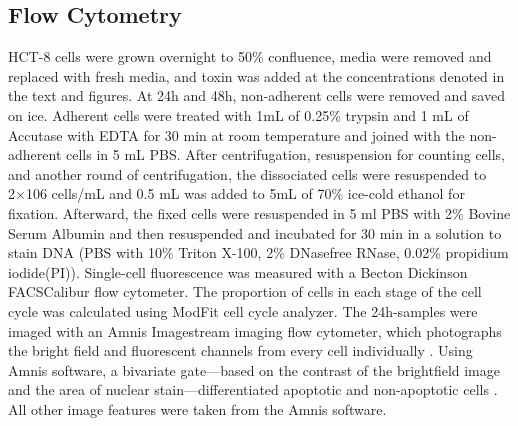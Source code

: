 \subsection{Flow Cytometry}
HCT-8 cells were grown overnight to 50\% confluence, media were removed and replaced with fresh media, and toxin was added at the concentrations denoted in the text and figures. At 24h and 48h, non-adherent cells were removed and saved on ice. Adherent cells were treated with 1mL of 0.25\% trypsin and 1 mL of Accutase with EDTA for 30 min at room temperature and joined with the non-adherent cells in 5 mL PBS. After centrifugation, resuspension for counting cells, and another round of centrifugation, the dissociated cells were resuspended to 2×106 cells/mL and 0.5 mL was added to 5mL of 70\% ice-cold ethanol for fixation. Afterward, the fixed cells were resuspended in 5 ml PBS with 2\% Bovine Serum Albumin and then resuspended and incubated for 30 min in a solution to stain DNA (PBS with 10\% Triton X-100, 2\% DNasefree RNase, 0.02\% propidium iodide(PI)). Single-cell fluorescence was measured with a Becton Dickinson FACSCalibur flow cytometer. The proportion of cells in each stage of the cell cycle was calculated using ModFit cell cycle analyzer. The 24h-samples were imaged with an Amnis Imagestream imaging flow cytometer, which photographs the bright field and fluorescent channels from every cell individually \cite{George:2004jj}. Using Amnis software, a bivariate gate—based on the contrast of the brightfield image and the area of nuclear stain—differentiated apoptotic and non-apoptotic cells \cite{Henery:2008jz}. All other image features were taken from the Amnis software.

